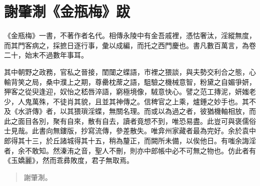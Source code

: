 \chapter*{謝肇淛《金瓶梅》跋}

《金瓶梅》一書，不著作者名代。相傳永陵中有金吾戚裡，憑怙奢汰，淫縱無度，而其門客病之，採摭日逐行事，彙以成編，而托之西門慶也。書凡數百萬言，為卷二十，始末不過數年事耳。

其中朝野之政務，官私之晉接，閨闥之蝶語，市裡之猥談，與夫勢交利合之態，心輸背笑之局，桑中濮上之期，尊罍枕蓆之語，駔驗之機械意智，粉黛之自媚爭妍，狎客之從臾逢迎，奴怡之嵇唇淬語，窮極境像，駥意快心。譬之范工摶泥，妍媸老少，人鬼萬殊，不徒肖其貌，且並其神傳之。信稗官之上乘，爐錘之妙手也。其不及《水滸傳》者，以其猥瑣淫蝶，無關名理。而或以為過之者，彼猶機軸相放，而此之面目各別，聚有自來，散有自去，讀者竟想不到，唯恐易盡。此豈可與褒儒俗士見哉。此書向無鏤版，抄寫流傳，參差散失。唯弇州家藏者最為完好。余於袁中郎得其十三，於丘諸城得其十五，稍為釐正，而闕所未備，以俟他日。有嗤余誨淫者，余不敢知。然溱洧之音，聖人不刪，則亦中郎帳中必不可無之物也。仿此者有《玉嬌麗》，然而乖彞敗度，君子無取焉。
  
\begin{quotation}\begin{flushright}謝肇淛。\end{flushright}\end{quotation}

